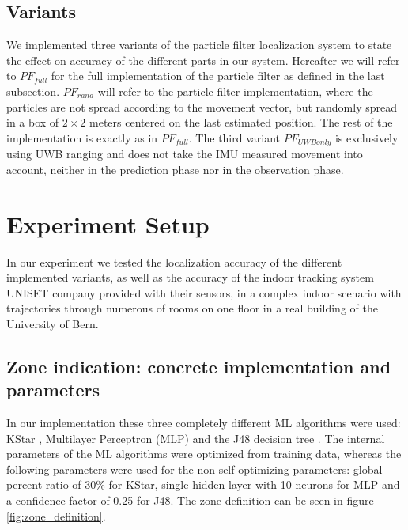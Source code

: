 \subsection{Variants}
We implemented three variants of the particle filter localization system to state the effect on accuracy of the different parts in our system.
Hereafter we will refer to $PF_{full}$ for the full implementation of the particle filter as defined in the last subsection. $PF_{rand}$ will refer to the particle filter implementation, where the particles are not spread according to the movement vector, but randomly spread in a box of $2 \times 2$ meters centered on the last estimated position. The rest of the implementation is exactly as in $PF_{full}$.
The third variant $PF_{UWBonly}$ is exclusively using UWB ranging and does not take the IMU measured movement into account, neither in the prediction phase nor in the observation phase.



\section{Experiment Setup}
In our experiment we tested the localization accuracy of the different implemented variants, as well as the accuracy of the indoor tracking system UNISET company provided with their sensors, in a complex indoor scenario with trajectories through numerous of rooms on one floor in a real building of the University of Bern.

\subsection{Zone indication: concrete implementation and parameters}
In our implementation these three completely different ML algorithms were used: KStar \cite{KStar}, Multilayer Perceptron (MLP) \cite{MLP} and the J48 decision tree \cite{J48}. 
The internal parameters of the ML algorithms were optimized from training data, whereas the following parameters were used for the non self optimizing parameters: global percent ratio of 30\% for KStar, single hidden layer with 10 neurons for MLP and a confidence factor of 0.25 for J48.
The zone definition can be seen in figure \ref{fig:zone_definition}.

